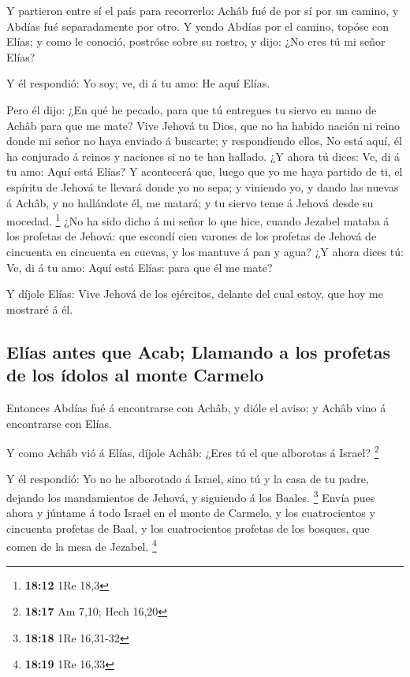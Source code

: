  Y partieron entre sí el país para recorrerlo: Achâb fué de
por sí por un camino, y Abdías fué separadamente por otro. 
Y yendo Abdías por el camino, topóse con Elías; y como le conoció,
postróse sobre su rostro, y dijo: ¿No eres tú mi señor Elías?

 Y él respondió: Yo soy; ve, di á tu amo: He aquí Elías.

 Pero él dijo: ¿En qué he pecado, para que tú entregues tu
siervo en mano de Achâb para que me mate?  Vive Jehová tu
Dios, que no ha habido nación ni reino donde mi señor no haya enviado á
buscarte; y respondiendo ellos, No está aquí, él ha conjurado á reinos y
naciones si no te han hallado.  ¿Y ahora tú dices: Ve, di á
tu amo: Aquí está Elías?  Y acontecerá que, luego que yo me
haya partido de ti, el espíritu de Jehová te llevará donde yo no sepa; y
viniendo yo, y dando las nuevas á Achâb, y no hallándote él, me matará;
y tu siervo teme á Jehová desde su mocedad. \footnote{\textbf{18:12} 1Re
  18,3}  ¿No ha sido dicho á mi señor lo que hice, cuando
Jezabel mataba á los profetas de Jehová: que escondí cien varones de los
profetas de Jehová de cincuenta en cincuenta en cuevas, y los mantuve á
pan y agua?  ¿Y ahora dices tú: Ve, di á tu amo: Aquí está
Elías: para que él me mate?

 Y díjole Elías: Vive Jehová de los ejércitos, delante del
cual estoy, que hoy me mostraré á él.

\hypertarget{eluxedas-antes-que-acab-llamando-a-los-profetas-de-los-uxeddolos-al-monte-carmelo}{%
\subsection{Elías antes que Acab; Llamando a los profetas de los ídolos
al monte
Carmelo}\label{eluxedas-antes-que-acab-llamando-a-los-profetas-de-los-uxeddolos-al-monte-carmelo}}

 Entonces Abdías fué á encontrarse con Achâb, y dióle el
aviso; y Achâb vino á encontrarse con Elías.

 Y como Achâb vió á Elías, díjole Achâb: ¿Eres tú el que
alborotas á Israel? \footnote{\textbf{18:17} Am 7,10; Hech 16,20}

 Y él respondió: Yo no he alborotado á Israel, sino tú y la
casa de tu padre, dejando los mandamientos de Jehová, y siguiendo á los
Baales. \footnote{\textbf{18:18} 1Re 16,31-32}  Envía pues
ahora y júntame á todo Israel en el monte de Carmelo, y los
cuatrocientos y cincuenta profetas de Baal, y los cuatrocientos profetas
de los bosques, que comen de la mesa de Jezabel. \footnote{\textbf{18:19}
  1Re 16,33}

